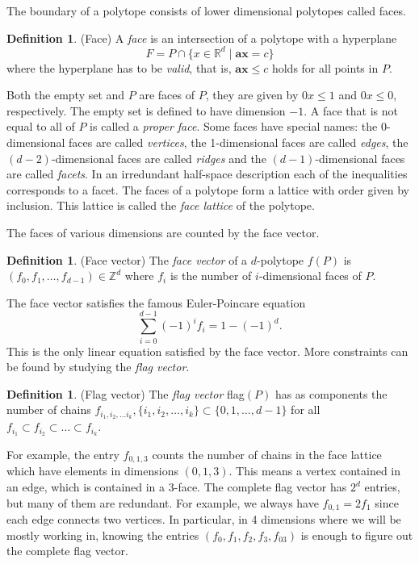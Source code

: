 \documentclass[a4paper,12pt]{book}
\theoremstyle{plain}
\theoremstyle{definition}
\newtheorem{definition}[theorem]{Definition}
\begin{document}
 The boundary 
of a polytope consists of lower dimensional polytopes called faces. 
\begin{definition}
 (Face) A \emph{face} is an intersection of a polytope with a hyperplane 
\begin{equation}
 F = P \cap \{x \in \mathbb{R}^d \mid \mathbf{a}\mathbf{x} = c\}
\end{equation}
where the hyperplane has to be \textit{valid}, that is, $\mathbf{a}\mathbf{x} 
\leq c$ holds for all points in $P$. 

\end{definition}
Both the empty set and $P$ are faces of $P$, they are given by $0x \le 1$ and $0x \le 0$, respectively.
The empty set is defined to have dimension $-1$.
A face that is not equal to all of $P$ is called a \textit{proper face}.
Some faces have special names: the 0-dimensional faces are called 
\textit{vertices}, the 1-dimensional faces are called \textit{edges}, the $(d-2)$-dimensional
faces are called \textit{ridges} and the 
$(d-1)$-dimensional faces are called \textit{facets}. In an irredundant 
half-space description each of the inequalities corresponds to a facet.
 The faces of a polytope 
form a lattice with order given by inclusion. This lattice is called the 
\textit{face lattice} of the polytope.

The faces of various dimensions 
are counted by the face vector.
\begin{definition}
 (Face vector) The \emph{face vector} of a $d$-polytope $f(P)$ is $(f_0, f_1, \dots, f_{d-1}) \in \mathbb{Z}^d$ 
where $f_i$ is 
the number of $i$-dimensional faces of $P$.
\end{definition}
The face vector satisfies the famous Euler-Poincare equation
\begin{equation}
 \sum_{i=0}^{d-1} (-1)^i f_i = 1 - (-1)^d.
\end{equation}
This is the only linear equation satisfied by the face vector. More 
constraints can be found by studying the \textit{flag vector}.

\begin{definition}
 (Flag vector) The \emph{flag vector} flag$(P)$ has as components the number of chains $f_{i_1,i_2,\dots i_k}, \{i_1,i_2,\dots, i_k \} \subset \{0,1,\dots, d-1\}$ for all
 $f_{i_1} \subset f_{i_2} \subset \dots \subset f_{i_k}$.
\end{definition}

For example, the entry $f_{0,1,3}$ counts the number of chains in the face 
lattice which have elements in dimensions $(0,1,3)$. This means a vertex contained in an
edge, which is contained in a 3-face. The complete flag vector has $2^d$ entries,
but many of them are redundant. For example, we always have $f_{0,1} = 2f_1$ since each edge
connects two vertices. In particular, in 4 dimensions where we will be mostly working in,
knowing the entries $(f_0, f_1, f_2, f_3, f_{03})$ is enough to figure out the complete flag vector.
\end{document}
